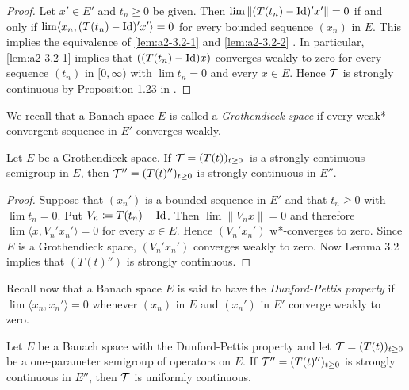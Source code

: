 \begin{proof}
Let $x' \in E'$ and $t_n \geq 0$ be given.
Then $\lim \|(T(t_n) - \operatorname{Id})'x'\| = 0$ if and only if $\lim \langle x_n, (T(t_n) - \operatorname{Id})'x' \rangle = 0$ for every bounded sequence $(x_n)$ in $E$.
This implies the equivalence of \ref{lem:a2-3.2-1}   and \ref{lem:a2-3.2-2} . 
In particular, \ref{lem:a2-3.2-1}   implies that $((T(t_n) - \operatorname{Id})x)$ converges weakly to zero for every sequence $(t_n)$ in $[0,\infty)$ with $\lim t_n = 0$ and every $x \in E$.
Hence $\mathcal{T}$ is strongly continuous by Proposition 1.23 
in \citet{davies:1980}.
\end{proof}

We recall that a Banach space $E$ is called a \emph{Grothendieck space} if every weak* convergent sequence in $E'$ converges weakly.
\begin{theorem}\label{thm:a2-3.3}
Let $E$ be a Grothendieck space.
If  $\mathcal{T}=(T(t))_{t \geq 0}$\, is a strongly continuous semigroup in $E$, then $\mathcal{T}'' = (T(t)'')_{t \geq 0}$ is strongly continuous in $E''$.
\end{theorem}

\begin{proof}
Suppose that $(x_{n}')$ is a bounded sequence in $E'$ and that $t_{n} \geq 0$ with $\lim t_{n} = 0$.
Put $V_{n} \coloneqq T(t_{n}) - \operatorname{Id}$.
Then $\lim \|V_{n}x\| = 0$ and therefore $\lim \langle x, V_{n}'x_{n}' \rangle = 0$ for every $x \in E$.
Hence $(V_{n}'x_{n}')$ w*-converges to zero.
Since $E$ is a Grothendieck space, $(V_{n}'x_{n}')$ converges weakly to zero.
Now Lemma 3.2 implies that $(T(t)'')$ is strongly continuous.
\end{proof}

Recall now that a Banach space $E$ is said to have the \emph{Dunford-Pettis property} if \\
$\lim \langle x_{n},x_{n}' \rangle = 0$ whenever $(x_{n})$ in $E$ and $(x_{n}')$ in $E'$ converge weakly to zero.

\begin{theorem}\label{thm:a2-3.4}
Let $E$ be a Banach space with the Dunford-Pettis property and let  $\mathcal{T} = (T(t))_{t \geq 0}$ be a one-parameter semigroup of operators on $E$.
If  $\mathcal{T}'' = (T(t)'')_{t \geq 0}$ is strongly continuous in $E''$, then $\mathcal{T}$ is uniformly continuous.
\end{theorem}

